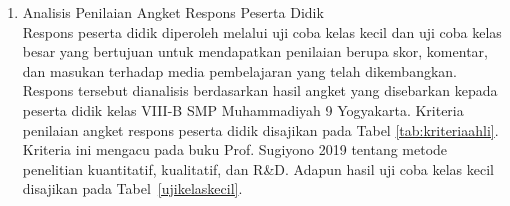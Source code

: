 \begin{enumerate}
    \hspace*{1cm}Dari Tabel \ref{penilaianmedia} diperoleh skor rata-rata penilaian kedua validator sebesar \(4{,}66\). Mengacu pada kriteria penilaian yang ditetapkan pada Tabel \ref{tab:kriteriaahli}, skor sebesar \(4{,}66\) berada di atas nilai ambang batas \(\bar{x} > 4{,}2\), sehingga termasuk dalam kategori \textbf{Sangat Baik}. Selain itu, kedua validator juga memberikan skor tinggi pada aspek kualitas perangkat lunak, dengan skor rata-rata sebesar \(4{,}83\), yang menunjukkan bahwa media pembelajaran berbasis simulasi 3D yang dikembangkan memiliki kualitas perangkat lunak yang sangat baik.

    \item Analisis Penilaian Angket Respons Peserta Didik\\
    \hspace*{1cm}Respons peserta didik diperoleh melalui uji coba kelas kecil dan uji coba kelas besar yang bertujuan untuk mendapatkan penilaian berupa skor, komentar, dan masukan terhadap media pembelajaran yang telah dikembangkan. Respons tersebut dianalisis berdasarkan hasil angket yang disebarkan kepada peserta didik kelas VIII-B SMP Muhammadiyah 9 Yogyakarta. Kriteria penilaian angket respons peserta didik disajikan pada Tabel \ref{tab:kriteriaahli}. Kriteria ini mengacu pada buku Prof. Sugiyono 2019 tentang metode penelitian kuantitatif, kualitatif, dan R\&D. Adapun hasil uji coba kelas kecil disajikan pada Tabel~\ref{ujikelaskecil}.


\end{enumerate}
